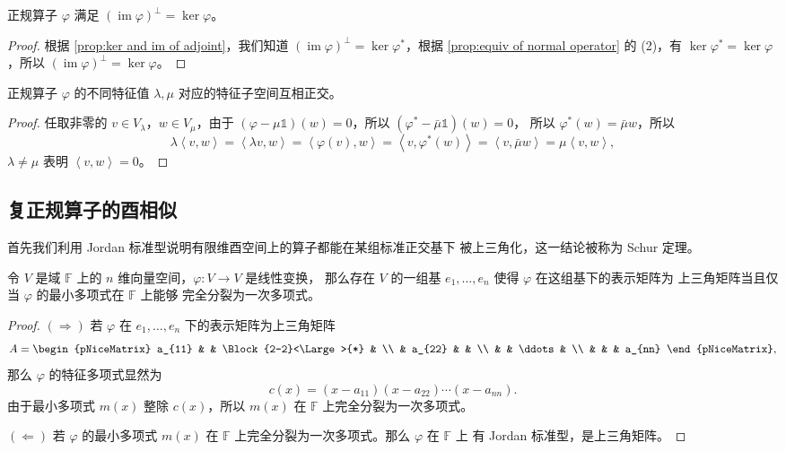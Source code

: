 \documentclass[fontset=none,zihao=-4]{Notes}
\DeclareMathOperator\im{im}
\newcommand{\inn}[1]{\left\langle#1\right\rangle}
\begin{document}
\begin{proposition}\label{prop:im of normal operator}
  正规算子 $\varphi$ 满足 $(\im\varphi)^\bot=\ker\varphi$。
\end{proposition}
\begin{proof}
  根据 \autoref{prop:ker and im of adjoint}，我们知道
  $(\im\varphi)^\bot=\ker\varphi^*$，根据 \autoref{prop:equiv of normal operator}
  的 (2)，有 $\ker\varphi^*=\ker\varphi$，所以 $(\im\varphi)^\bot=\ker\varphi$。
\end{proof}

\begin{proposition}\label{prop:eigenvec is orthonormal}
  正规算子 $\varphi$ 的不同特征值 $\lambda,\mu$ 对应的特征子空间互相正交。
\end{proposition}
\begin{proof}
  任取非零的 $v\in V_\lambda$，$w\in V_\mu$，由于
  $(\varphi-\mu \mathbb{1})(w)=0$，所以 $(\varphi^*-\bar\mu\mathbb{1})(w)=0$，
  所以 $\varphi^*(w)=\bar\mu w$，所以
  \[
    \lambda\inn{v,w}=\inn{\lambda v,w}=\inn{\varphi(v),w}=\inn{v,\varphi^*(w)}
    =\inn{v,\bar\mu w}  =\mu\inn{v,w},
  \]
  $\lambda\neq\mu$ 表明 $\inn{v,w}=0$。
\end{proof}

\subsection{复正规算子的酉相似}

首先我们利用 Jordan 标准型说明有限维酉空间上的算子都能在某组标准正交基下
被上三角化，这一结论被称为 Schur 定理。

\begin{theorem}
  令 $V$ 是域 $\mathbb{F}$ 上的 $n$ 维向量空间，$\varphi:V\to V$ 是线性变换，
  那么存在 $V$ 的一组基 $e_1,\dots,e_n$ 使得 $\varphi$ 在这组基下的表示矩阵为
  上三角矩阵当且仅当 $\varphi$ 的最小多项式在 $\mathbb{F}$ 上能够
  完全分裂为一次多项式。
\end{theorem}
\begin{proof}
  $(\Rightarrow)$ 若 $\varphi$ 在 $e_1,\dots,e_n$ 下的表示矩阵为上三角矩阵
  \[
    A=
    \begin{pNiceMatrix}
      a_{11} & & \Block{2-2}<\Large>{*} & \\
      & a_{22} & & \\
      & & \ddots & \\
      & & & a_{nn}
    \end{pNiceMatrix}  ,
  \]
  那么 $\varphi$ 的特征多项式显然为
  \[
    c(x)=(x-a_{11})(x-a_{22})\cdots(x-a_{nn}).
  \]
  由于最小多项式 $m(x)$ 整除 $c(x)$，所以 $m(x)$ 在 $\mathbb{F}$
  上完全分裂为一次多项式。

  $(\Leftarrow)$ 若 $\varphi$ 的最小多项式 $m(x)$ 在 $\mathbb{F}$
  上完全分裂为一次多项式。那么 $\varphi$ 在 $\mathbb{F}$ 上
  有 Jordan 标准型，是上三角矩阵。
\end{proof}
\end{document}
